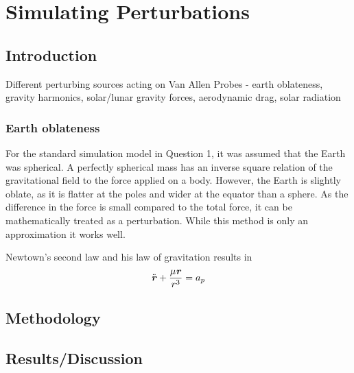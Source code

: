\documentclass[Space3_Assign1.tex]{subfiles}
\begin{document}
\section{Simulating Perturbations}

\subsection{Introduction}
Different perturbing sources acting on Van Allen Probes - earth oblateness, gravity harmonics, solar/lunar gravity forces, aerodynamic drag, solar radiation\\

\subsubsection{Earth oblateness}
For the standard simulation model in Question 1, it was assumed that the Earth was spherical. A perfectly spherical mass has an inverse square relation of the gravitational field to the force applied on a body. However, the Earth is slightly oblate, as it is flatter at the poles and wider at the equator than a sphere. As the difference in the force is small compared to the total force, it can be mathematically treated as a perturbation. While this method is only an approximation it works well.


Newtown's second law and his law of gravitation results in 
\begin{eqnarray}
\ddot{\textbf{\textit{r}}}+\frac{\mu\textbf{\textit{r}}}{r^3} = a_p
\end{eqnarray}

\subsection{Methodology}




\subsection{Results/Discussion}
\end{document}
